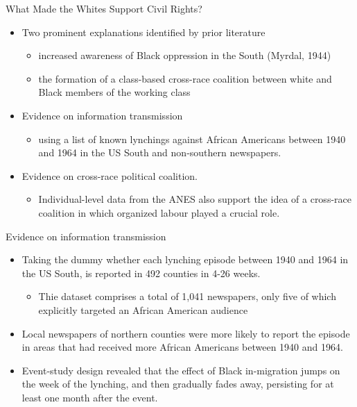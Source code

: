 \documentclass[dvipdfmx,11pt]{beamer}
\begin{document}
\begin{frame}{What Made the Whites Support Civil Rights?}
  \begin{itemize}
    \item Two prominent explanations identified by prior literature
    \begin{itemize}
      \item increased awareness of Black oppression in the South (Myrdal, 1944)
      \item the formation of a class-based cross-race coalition between white and Black members of the working class
    \end{itemize}
    \item Evidence on information transmission
    \begin{itemize}
      \item using a list of known lynchings against African Americans between 1940 and 1964 in the US South and non-southern newspapers.
    \end{itemize}
    \item Evidence on cross-race political coalition.
    \begin{itemize}
      \item Individual-level data from the ANES also support the idea of a cross-race coalition in which organized labour played a crucial role.
    \end{itemize}
  \end{itemize}
\end{frame}

\begin{frame}{Evidence on information transmission}
  \begin{itemize}
    \item Taking the dummy whether each lynching episode between 1940 and 1964 in the US South, is reported in 492 counties in 4-26 weeks.
    \begin{itemize}
      \item Thie dataset comprises a total of 1,041 newspapers, only five of which explicitly targeted an African American audience
    \end{itemize}
    \item Local newspapers of northern counties were more likely to report the episode in areas that had received more African Americans between 1940 and 1964.
    \item Event-study design revealed that the effect of Black in-migration jumps on the week of the lynching,
    and then gradually fades away, persisting for at least one month after the event.
  \end{itemize}
\end{frame}
\end{document}

